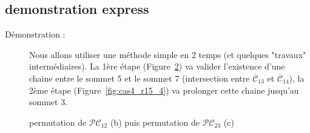 \documentclass[french]{report}
\begin{document}
\subsection{demonstration express}
\begin{description}
\item [Démonstration :] Nous allons utiliser une méthode simple en 2 temps (et quelques "travaux" intermédiaires).
La 1ère étape (Figure~\ref{fig:cas4_etap15_3}) va valider l’existence d'une chaine entre le sommet 5 et le sommet 7 (intersection entre $\overline{\mathcal{C}}_{13}$ et $\overline{\mathcal{C}}_{14}$), la 2ème étape (Figure~\ref{fig:cas4_r15_4}) va prolonger cette chaine jusqu'au sommet 3.
\end{description}
\FloatBarrier
\begin{figure}[!ht]\centering
	\begin{changemargin}{-3cm}{-5cm}
	\begin{center}
		\begin{subfigure}{0.4\textwidth}
			
			\caption{}\label{fig:cas4_etap15_2}
		\end{subfigure}
		\begin{subfigure}{0.4\textwidth}
			
			\caption{}\label{fig:cas4_etap15_3}
		\end{subfigure}
		\begin{subfigure}{0.4\textwidth}
			
			\caption{}\label{fig:cas4_etap15_4}
		\end{subfigure}
	\end{center}
	\caption{permutation de $\mathcal{PC}_{12}$ (b) puis permutation de $\mathcal{PC}_{23}$ (c)}
	\end{changemargin}
\end{figure}	
\FloatBarrier
\end{document}
